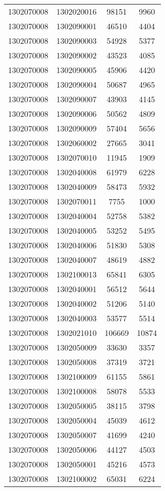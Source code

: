 \begin{longtable}{llcc}
1302070008 & 1302020016 & 98151 & 9960\\
1302070008 & 1302090001 & 46510 & 4404\\
1302070008 & 1302090003 & 54928 & 5377\\
1302070008 & 1302090002 & 43523 & 4085\\
1302070008 & 1302090005 & 45906 & 4420\\
1302070008 & 1302090004 & 50687 & 4965\\
1302070008 & 1302090007 & 43903 & 4145\\
1302070008 & 1302090006 & 50562 & 4809\\
1302070008 & 1302090009 & 57404 & 5656\\
1302070008 & 1302060002 & 27665 & 3041\\
1302070008 & 1302070010 & 11945 & 1909\\
1302070008 & 1302040008 & 61979 & 6228\\
1302070008 & 1302040009 & 58473 & 5932\\
1302070008 & 1302070011 & 7755 & 1000\\
1302070008 & 1302040004 & 52758 & 5382\\
1302070008 & 1302040005 & 53252 & 5495\\
1302070008 & 1302040006 & 51830 & 5308\\
1302070008 & 1302040007 & 48619 & 4882\\
1302070008 & 1302100013 & 65841 & 6305\\
1302070008 & 1302040001 & 56512 & 5644\\
1302070008 & 1302040002 & 51206 & 5140\\
1302070008 & 1302040003 & 53577 & 5514\\
1302070008 & 1302021010 & 106669 & 10874\\
1302070008 & 1302050009 & 33630 & 3357\\
1302070008 & 1302050008 & 37319 & 3721\\
1302070008 & 1302100009 & 61155 & 5861\\
1302070008 & 1302100008 & 58078 & 5533\\
1302070008 & 1302050005 & 38115 & 3798\\
1302070008 & 1302050004 & 45039 & 4612\\
1302070008 & 1302050007 & 41699 & 4240\\
1302070008 & 1302050006 & 44127 & 4503\\
1302070008 & 1302050001 & 45216 & 4573\\
1302070008 & 1302100002 & 65031 & 6224\\

\end{longtable}
